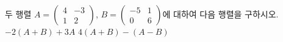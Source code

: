\hspace*{2mm}\begin{minipage}[t]{\dimexpr\linewidth-2mm\relax}\vspace{0pt}
두 행렬 $A=\begin{pmatrix} 4 & -3 \\ 1 & 2 \end{pmatrix}$, $B=\begin{pmatrix} -5 & 1 \\ 0 & 6 \end{pmatrix}$에 대하여 다음 행렬을 구하시오.
 $-2(A+B)+3A$
 $4(A+B)-(A-B)$\end{minipage}
